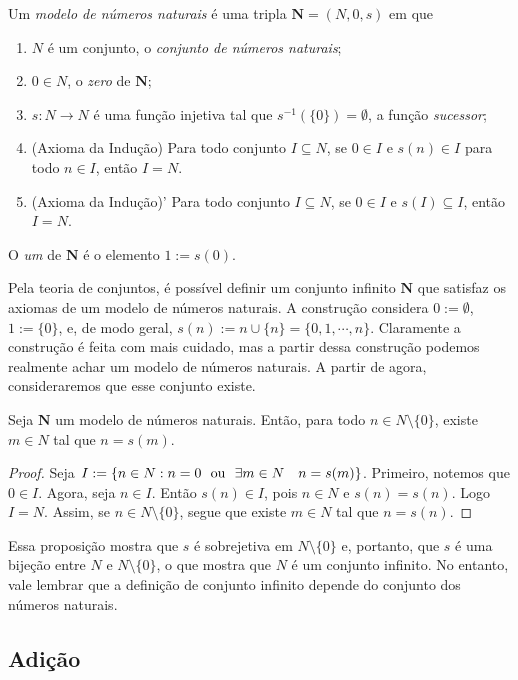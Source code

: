 \begin{defi}
	Um \emph{modelo de números naturais} é uma tripla $\bm N = (N,0,s)$ em que 
	\begin{enumerate}
	\item $N$ é um conjunto, o \emph{conjunto de números naturais};
	\item $0 \in N$, o \emph{zero} de $\bm N$;
	\item $s: N \to N$ é uma função injetiva tal que $s^{-1}(\{0\})=\emptyset$, a função \emph{sucessor};
	\item (Axioma da Indução) Para todo conjunto $I \subseteq N$, se $0 \in I$ e $s(n) \in I$ para todo $n \in I$, então $I=N$.
	\item (Axioma da Indução)' Para todo conjunto $I \subseteq N$, se $0 \in I$ e $s(I) \subseteq I$, então $I=N$.
	\end{enumerate}
	O \emph{um} de $\bm N$ é o elemento $1 := s(0)$.
\end{defi}

	Pela teoria de conjuntos, é possível definir um conjunto infinito $\bm N$ que satisfaz os axiomas de um modelo de números naturais. A construção considera $0 := \emptyset$, $1 := \{0\}$, e, de modo geral, $s(n) := n \cup \{n\} = \{0,1,\cdots,n\}$. Claramente a construção é feita com mais cuidado, mas a partir dessa construção podemos realmente achar um modelo de números naturais. A partir de agora, consideraremos que esse conjunto existe.

\begin{prop}
	Seja $\bm N$ um  modelo de números naturais. Então, para todo $n \in N\setminus \{0\}$, existe $m \in N$ tal que $n=s(m)$.
\end{prop}
\begin{proof}
	Seja $I := \{n \in N:n=0 \text{\ \ ou\ \ } \exists m \in N \quad n=s(m)\}$. Primeiro, notemos que $0 \in I$. Agora, seja $n \in I$. Então $s(n) \in I$, pois $n \in N$ e $s(n)=s(n)$. Logo $I=N$. Assim, se $n \in N \setminus \{0\}$, segue que existe $m \in N$ tal que $n=s(n)$.
\end{proof}

Essa proposição mostra que $s$ é sobrejetiva em $N \setminus \{0\}$ e, portanto, que $s$ é uma bijeção entre $N$ e $N \setminus \{0\}$, o que mostra que $N$ é um conjunto infinito. No entanto, vale lembrar que a definição de conjunto infinito depende do conjunto dos números naturais.

\subsection{Adição}


